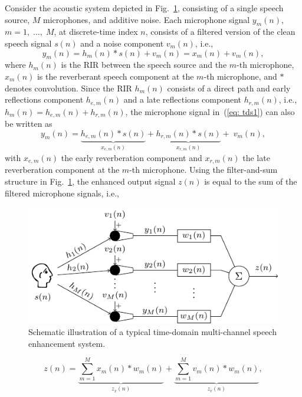 \documentclass{aes60i}
\begin{document}
Consider the acoustic system depicted in Fig.~\ref{fig: configuration}, consisting of a single speech source, $M$ microphones, and additive noise.
Each microphone signal $y_m(n)$, $m = 1, \; \ldots, \; M$, at discrete-time index $n$, consists of a filtered version of the clean speech signal $s(n)$ and a noise component $v_m(n)$, i.e., 
\begin{equation}
\label{eq: tds1}
y_m(n)  = h_m(n) \ast s(n) + v_m(n) = x_m(n) + v_m(n),
\end{equation}
where $h_m(n)$ is the RIR between the speech source and the $m$-th microphone, $x_m(n)$ is the reverberant speech component at the $m$-th microphone, and $\ast$ denotes convolution.
Since the RIR $h_m(n)$ consists of a direct path and early reflections component $h_{e,m}(n)$ and a late reflections component $h_{r,m}(n)$, i.e., $h_{m}(n) = h_{e,m}(n) + h_{r,m}(n)$, the microphone signal in~(\ref{eq: tds1}) can also be written as
\begin{equation}
\label{eq: ysp}
y_m(n)  = \underbrace{h_{e,m}(n) \ast s(n)}_{x_{e,m}(n)} + \underbrace{h_{r,m}(n) \ast s(n)}_{x_{r,m}(n)} + \; v_m(n),
\end{equation}
with $x_{e,m}(n)$ the early reverberation component and $x_{r,m}(n)$ the late reverberation component at the $m$-th microphone.
Using the filter-and-sum structure in Fig.~\ref{fig: configuration}, the enhanced output signal $z(n)$ is equal to the sum of the filtered microphone signals, i.e., 
\begin{figure}[b!]
\centering
\includegraphics[scale=0.8]{Plots/configuration.pdf}
\caption{Schematic illustration of a typical time-domain multi-channel speech enhancement system.}
\label{fig: configuration}
\end{figure}
\begin{equation}
\label{eq: outcomp}
z(n) = \underbrace{\sum_{m=1}^M x_m(n) \ast w_m(n)}_{z_x(n)}  + \underbrace{\sum_{m=1}^M v_m(n) \ast w_m(n)}_{z_v(n)},
\end{equation}
\end{document}
